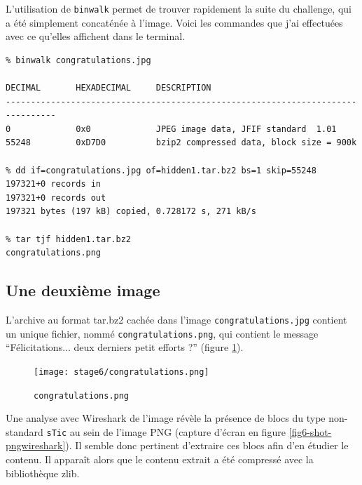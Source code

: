 \documentclass[a4paper,10pt]{article}
\begin{document}
L'utilisation de \texttt{binwalk} permet de trouver rapidement la suite du challenge, qui a été simplement concaténée à l'image.
Voici les commandes que j'ai effectuées avec ce qu'elles affichent dans le terminal.
\begin{verbatim}
% binwalk congratulations.jpg

DECIMAL       HEXADECIMAL     DESCRIPTION
--------------------------------------------------------------------------------
0             0x0             JPEG image data, JFIF standard  1.01
55248         0xD7D0          bzip2 compressed data, block size = 900k

% dd if=congratulations.jpg of=hidden1.tar.bz2 bs=1 skip=55248
197321+0 records in
197321+0 records out
197321 bytes (197 kB) copied, 0.728172 s, 271 kB/s

% tar tjf hidden1.tar.bz2
congratulations.png
\end{verbatim}

\subsection{Une deuxième image}

L'archive au format tar.bz2 cachée dans l'image \texttt{congratulations.jpg} contient un unique fichier, nommé \texttt{congratulations.png}, qui contient le message ``Félicitations... deux derniers petit efforts ?'' (figure \ref{fig6-png}).

\begin{figure}[ht]
  \centering
  \texttt{[image: stage6/congratulations.png]}
  \caption{\texttt{congratulations.png}}
  \label{fig6-png}
\end{figure}

Une analyse avec Wireshark de l'image révèle la présence de blocs du type non-standard \texttt{sTic} au sein de l'image PNG (capture d'écran en figure \ref{fig6-shot-pngwireshark}).
Il semble donc pertinent d'extraire ces blocs afin d'en étudier le contenu.
Il apparaît alors que le contenu extrait a été compressé avec la bibliothèque zlib.
\end{document}
